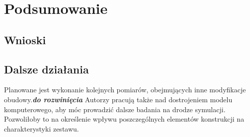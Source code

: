 \documentclass[12pt]{oska}
\newcommand{\comment}[1]{{\color{magenta}\emph{\textbf{#1}}}}
\begin{document}
\section{Podsumowanie}
	
	\subsection{Wnioski}
	
	\subsection{Dalsze działania}
	
		Planowane jest wykonanie kolejnych pomiarów, obejmujących inne modyfikacje obudowy.\comment{do rozwinięcia} Autorzy pracują także nad dostrojeniem modelu komputerowego, aby móc prowadzić dalsze badania na drodze symulacji. Pozwoliłoby to na określenie wpływu poszczególnych elementów konstrukcji na charakterystyki zestawu.
		
\printbibliography
\end{document}
